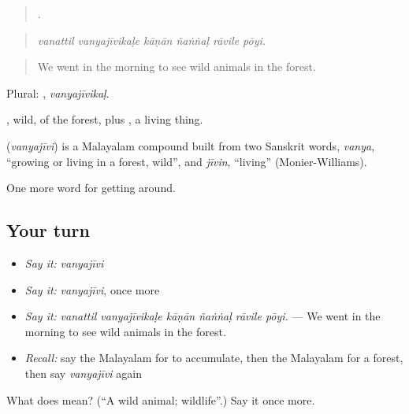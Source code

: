 \begin{quote}
     .
\end{quote}

\begin{quote}
\emph{vanattil vanyajīvikaḷe kāṇān ñaṅṅaḷ rāvile pōyi.}
\end{quote}

\begin{quote}
We went in the morning to see wild animals in the forest.
\end{quote}

Plural: , \emph{vanyajīvikaḷ}.

, wild, of the forest, plus , a living thing.

\begin{cousinweb}
\textbf{} (\emph{vanyajīvi}) is a Malayalam compound built from two Sanskrit words, \emph{vanya}, \textquotedblleft{}growing or living in a forest, wild\textquotedblright{}, and \emph{jīvin}, \textquotedblleft{}living\textquotedblright{} (Monier-Williams).
\end{cousinweb}

\begin{grammarlens}[title={What you've built}]
One more word for getting around.
\end{grammarlens}

\subsection*{Your turn}
\begin{itemize}
\raggedright
  \item \emph{Say it:} \emph{vanyajīvi}
  \item \emph{Say it:} \emph{vanyajīvi}, once more
  \item \emph{Say it:} \emph{vanattil vanyajīvikaḷe kāṇān ñaṅṅaḷ rāvile pōyi.} — We went in the morning to see wild animals in the forest.
  \item \emph{Recall:} say the Malayalam for to accumulate, then the Malayalam for a forest, then say \emph{vanyajīvi} again
\end{itemize}

\begin{tcolorbox}[breakable,colback=teal!4,colframe=teal!35!black,title={Before you move on}]
What does  mean? (\textquotedblleft{}A wild animal; wildlife\textquotedblright{}.) Say it once more.
\end{tcolorbox}
